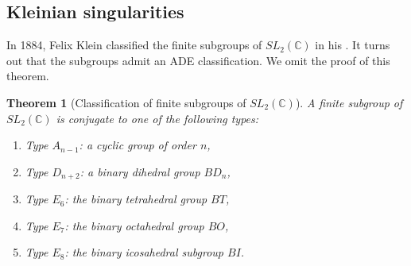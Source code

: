 \documentclass[12pt]{report}
\newtheorem{theorem}{Theorem}[section]
\theoremstyle{remark}
\theoremstyle{definition}
\newcommand{\C}[0]{\mathbb{C}}
\begin{document}
    \subsection{Kleinian singularities}
    In 1884, Felix Klein classified the finite subgroups of $SL_2(\C)$ in his \cite{Klein1884}. It turns out that the subgroups admit an ADE classification. We omit the proof of this theorem.
    \begin{theorem}[Classification of finite subgroups of $SL_2(\C)$]
        A finite subgroup of $SL_2(\C)$ is conjugate to one of the following types:
        \begin{enumerate}[\normalfont(i)]
            \item Type $A_{n-1}$: a cyclic group of order $n$,
            \item Type $D_{n+2}$: a binary dihedral group $BD_{n}$,
            \item Type $E_6$: the binary tetrahedral group $BT$,
            \item Type $E_7$: the binary octahedral group $BO$,
            \item Type $E_8$: the binary icosahedral subgroup $BI$.
        \end{enumerate}
    \end{theorem}
\end{document}
